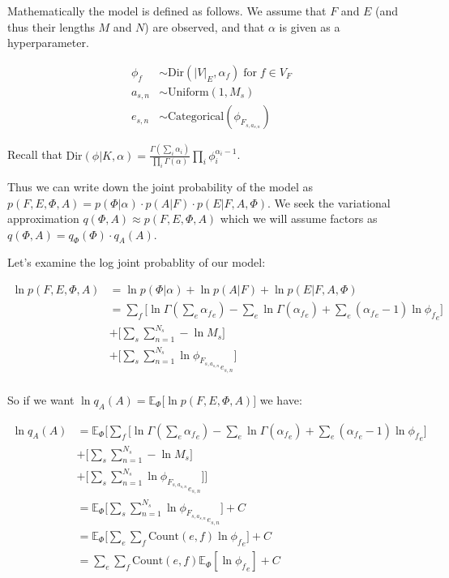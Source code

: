 \documentclass[11pt]{article}
\begin{document}
Mathematically the model is defined as follows. We assume that $F$ and $E$ (and thus their lengths $M$ and $N$) are observed, and that $\alpha$ is given as a hyperparameter.

\begin{align*}
\phi_f &\sim \text{Dir}(|V|_E, \alpha_f)\;\text{for}\;f \in V_F \\
a_{s,n} &\sim \text{Uniform}(1, M_s) \\
e_{s,n} &\sim \text{Categorical}(\phi_{F_{s, a_{s, n}}})
\end{align*}

Recall that $\text{Dir}(\phi | K, \alpha) = \frac{\Gamma(\sum_i\alpha_i)}{\prod_i\Gamma(\alpha)} \prod_{i} \phi_i^{\alpha_i - 1}$.

Thus we can write down the joint probability of the model as
$p(F, E, \Phi, A) = p(\Phi | \alpha) \cdot p(A | F) \cdot p(E | F, A, \Phi)$.
We seek the variational approximation $q(\Phi, A) \approx p(F, E, \Phi, A)$ which we will assume factors as $q(\Phi, A) = q_\Phi(\Phi) \cdot q_A(A)$.

Let's examine the log joint probablity of our model:

\begin{align*}
\ln p(F, E, \Phi, A) &= \ln p(\Phi | \alpha) + \ln p(A | F) + \ln p(E | F, A, \Phi) \\
&= \sum_f \big[ \ln \Gamma(\sum_e {\alpha_f}_e) - \sum_e \ln \Gamma({\alpha_f}_e) + \sum_e ({\alpha_f}_e - 1) \ln {\phi_f}_e \big] \\
&+ \big[\sum_s \sum_{n=1}^{N_s} -\ln M_s \big] \\
&+ \big[ \sum_s \sum_{n=1}^{N_s} \ln {\phi_{F_{s, a_{s, n}}}}_{e_{s,n}} \big] \\
\end{align*}

So if we want $\ln q_A(A) = \mathbb{E}_\Phi \big[ \ln p(F, E, \Phi, A) \big]$ we have:

\begin{align*}
\ln q_A(A) &= \mathbb{E}_\Phi \bigg[ \sum_f \big[ \ln \Gamma(\sum_e {\alpha_f}_e) - \sum_e \ln \Gamma({\alpha_f}_e) + \sum_e ({\alpha_f}_e - 1) \ln {\phi_f}_e \big] \\
&+ \big[\sum_s \sum_{n=1}^{N_s} -\ln M_s \big]\\
&+ \big[ \sum_s \sum_{n=1}^{N_s} \ln {\phi_{F_{s, a_{s, n}}}}_{e_{s,n}} \big] \bigg] \\
&= \mathbb{E}_\Phi \bigg[ \sum_s \sum_{n=1}^{N_s} \ln {\phi_{F_{s, a_{s, n}}}}_{e_{s,n}} \bigg] + C \\
&= \mathbb{E}_\Phi \bigg[ \sum_e \sum_f \text{Count}(e, f) \ln{\phi_f}_e \bigg] + C \\
&= \sum_e \sum_f \text{Count}(e, f) \mathbb{E}_\Phi [\ln {\phi_f}_e] + C \\
\end{align*}
\end{document}
